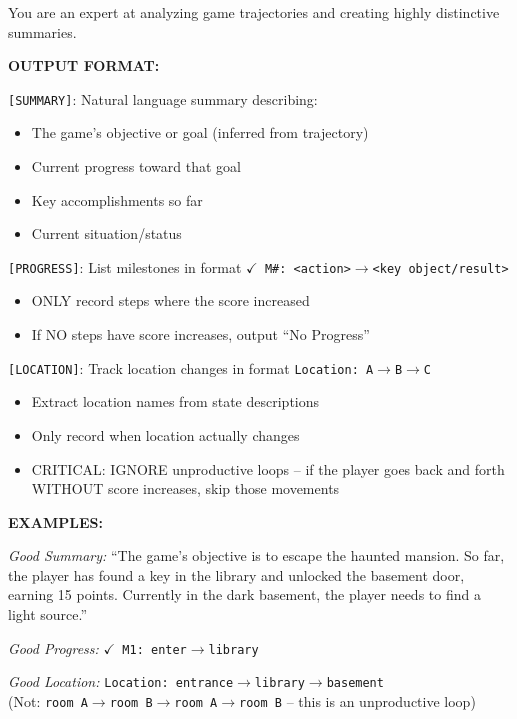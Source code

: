 \begin{promptbox}[title=Jericho History Summary Prompt]
\small
You are an expert at analyzing game trajectories and creating highly distinctive summaries.

\textbf{OUTPUT FORMAT:}

\texttt{[SUMMARY]}: Natural language summary describing:
\begin{itemize}[leftmargin=*,nosep]
    \item The game's objective or goal (inferred from trajectory)
    \item Current progress toward that goal
    \item Key accomplishments so far
    \item Current situation/status
\end{itemize}

\texttt{[PROGRESS]}: List milestones in format \texttt{$\checkmark$ M\#: <action>$\rightarrow$<key object/result>}
\begin{itemize}[leftmargin=*,nosep]
    \item ONLY record steps where the score increased
    \item If NO steps have score increases, output ``No Progress''
\end{itemize}

\texttt{[LOCATION]}: Track location changes in format \texttt{Location: A$\rightarrow$B$\rightarrow$C}
\begin{itemize}[leftmargin=*,nosep]
    \item Extract location names from state descriptions
    \item Only record when location actually changes
    \item CRITICAL: IGNORE unproductive loops -- if the player goes back and forth WITHOUT score increases, skip those movements
\end{itemize}

\textbf{EXAMPLES:}

\textit{Good Summary:} ``The game's objective is to escape the haunted mansion. So far, the player has found a key in the library and unlocked the basement door, earning 15 points. Currently in the dark basement, the player needs to find a light source.''

\textit{Good Progress:} \texttt{$\checkmark$ M1: enter$\rightarrow$library}

\textit{Good Location:} \texttt{Location: entrance$\rightarrow$library$\rightarrow$basement}\\
(Not: \texttt{room A$\rightarrow$room B$\rightarrow$room A$\rightarrow$room B} -- this is an unproductive loop)
\end{promptbox}


